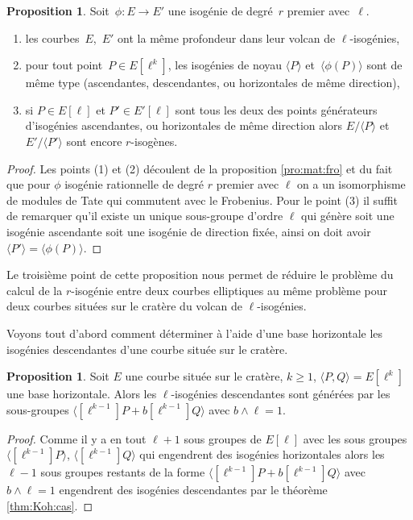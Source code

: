 \documentclass[10pt,a4paper]{book}
\theoremstyle{plain}
\theoremstyle{definition}
\theoremstyle{definition}
\theoremstyle{definition}
\newtheorem{prop}[thm]{Proposition}
\theoremstyle{definition}
\theoremstyle{remark}
\theoremstyle{remark}
\theoremstyle{definition}
\begin{document}
\begin{prop}\label{pro:par:iso}
Soit~$\phi: E \rightarrow E'$ une isogénie de degré~$r$ premier avec~$\ell$.
\begin{enumerate}
\item les courbes~$E$,~$E'$ ont la même profondeur dans leur volcan de
 $\ell$-isogénies,
\item\label{pro:par:fun} pour tout point~$P \in E[\ell^k]$,
les isogénies de noyau $\langle P \rangle$ et~$\langle \phi(P) \rangle$ sont de même type
(ascendantes, descendantes, ou horizontales de même direction),
\item\label{pro:par:asc} si $P \in E[\ell]$ et $P' \in E'[\ell]$ sont tous les 
deux des points générateurs d'isogénies ascendantes, ou horizontales de même 
direction alors $E/\langle P \rangle$ et~$E'/\langle P' \rangle$ sont encore $r$-isogènes.
\end{enumerate}
\end{prop}

\begin{proof}
Les points (1) et (2) découlent de la proposition \ref{pro:mat:fro} et du fait que pour $\phi$ isogénie rationnelle de degré $r$ premier avec $\ell$ on a un isomorphisme de modules de Tate qui commutent avec le Frobenius. Pour le point (3) il suffit de remarquer qu'il existe un unique sous-groupe d'ordre $\ell$ qui génère soit une isogénie ascendante soit une isogénie de direction fixée, ainsi on doit avoir $\langle P' \rangle=\langle \phi(P) \rangle$.

\end{proof}
Le troisième point de cette proposition nous permet de réduire le problème du calcul de la $r$-isogénie entre deux courbes elliptiques au même problème pour deux courbes situées sur le cratère du volcan de $\ell$-isogénies.

Voyons tout d'abord comment déterminer à l'aide d'une base horizontale les isogénies descendantes d'une courbe située sur le cratère.

\begin{prop}
Soit $E$ une courbe située sur le cratère, $k\geqslant 1$, $\langle P, Q \rangle= E[\ell^k]$ une base horizontale. Alors les $\ell$-isogénies descendantes sont générées par les sous-groupes $\langle [\ell^{k-1}]P+ b [\ell^{k-1}]Q \rangle$ avec $b \wedge \ell =1$.
\end{prop}

\begin{proof}
Comme il y a en tout $\ell+1$ sous groupes de $E[\ell]$ avec les sous groupes $\langle [\ell^{k-1}]P \rangle$,  $\langle [\ell^{k-1}]Q \rangle$ qui engendrent des isogénies horizontales alors les $\ell-1$ sous groupes restants de la forme $\langle [\ell^{k-1}]P+ b [\ell^{k-1}]Q \rangle$ avec $b \wedge \ell =1$ engendrent des isogénies descendantes par le théorème \ref{thm:Koh:cas}.
\end{proof}
\end{document}
